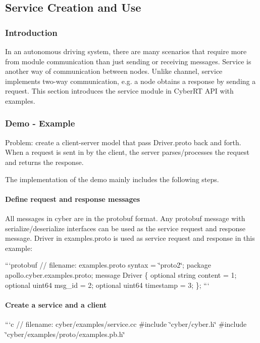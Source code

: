 \subsection*{Service Creation and Use}

\subsubsection*{Introduction}

In an autonomous driving system, there are many scenarios that require more from module communication than just sending or receiving messages. Service is another way of communication between nodes. Unlike channel, service implements {\ttfamily two-\/way} communication, e.\-g. a node obtains a response by sending a request. This section introduces the {\ttfamily service} module in Cyber\-R\-T A\-P\-I with examples.

\subsubsection*{Demo -\/ Example}

Problem\-: create a client-\/server model that pass Driver.\-proto back and forth. When a request is sent in by the client, the server parses/processes the request and returns the response.

The implementation of the demo mainly includes the following steps.

\paragraph*{Define request and response messages}

All messages in cyber are in the {\ttfamily protobuf} format. Any protobuf message with serialize/deserialize interfaces can be used as the service request and response message. {\ttfamily Driver} in examples.\-proto is used as service request and response in this example\-:

```protobuf // filename\-: examples.\-proto syntax = \char`\"{}proto2\char`\"{}; package apollo.\-cyber.\-examples.\-proto; message Driver \{ optional string content = 1; optional uint64 msg\-\_\-id = 2; optional uint64 timestamp = 3; \}; ``` \paragraph*{Create a service and a client}

```c // filename\-: cyber/examples/service.\-cc \#include \char`\"{}cyber/cyber.\-h\char`\"{} \#include \char`\"{}cyber/examples/proto/examples.\-pb.\-h\char`\"{}

